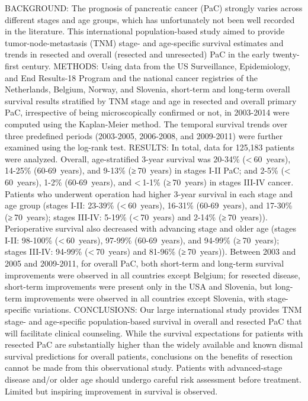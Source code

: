 \documentclass[]{article}
\begin{document}
BACKGROUND: The prognosis of pancreatic cancer (PaC) strongly varies
across different stages and age groups, which has unfortunately not been
well recorded in the literature. This international population-based
study aimed to provide tumor-node-metastasis (TNM) stage- and
age-specific survival estimates and trends in resected and overall
(resected and unresected) PaC in the early twenty-first century.
METHODS: Using data from the US Surveillance, Epidemiology, and End
Results-18 Program and the national cancer registries of the
Netherlands, Belgium, Norway, and Slovenia, short-term and long-term
overall survival results stratified by TNM stage and age in resected and
overall primary PaC, irrespective of being microscopically confirmed or
not, in 2003-2014 were computed using the Kaplan-Meier method. The
temporal survival trends over three predefined periods (2003-2005,
2006-2008, and 2009-2011) were further examined using the log-rank test.
RESULTS: In total, data for 125,183 patients were analyzed. Overall,
age-stratified 3-year survival was 20-34\% (\textless{} 60~years),
14-25\% (60-69~years), and 9-13\% (≥ 70~years) in stages I-II PaC; and
2-5\% (\textless{} 60~years), 1-2\% (60-69~years), and \textless{} 1-1\%
(≥ 70~years) in stages III-IV cancer. Patients who underwent operation
had higher 3-year survival in each stage and age group (stages I-II:
23-39\% (\textless{} 60~years), 16-31\% (60-69~years), and 17-30\%
(≥ 70~years); stages III-IV: 5-19\% (\textless{} 70~years) and 2-14\%
(≥ 70~years)). Perioperative survival also decreased with advancing
stage and older age (stages I-II: 98-100\% (\textless{} 60~years),
97-99\% (60-69~years), and 94-99\% (≥ 70~years); stages III-IV: 94-99\%
(\textless{} 70~years) and 81-96\% (≥ 70~years)). Between 2003 and 2005
and 2009-2011, for overall PaC, both short-term and long-term survival
improvements were observed in all countries except Belgium; for resected
disease, short-term improvements were present only in the USA and
Slovenia, but long-term improvements were observed in all countries
except Slovenia, with stage-specific variations. CONCLUSIONS: Our large
international study provides TNM stage- and age-specific
population-based survival in overall and resected PaC that will
facilitate clinical counseling. While the survival expectations for
patients with resected PaC are substantially higher than the widely
available and known dismal survival predictions for overall patients,
conclusions on the benefits of resection cannot be made from this
observational study. Patients with advanced-stage disease and/or older
age should undergo careful risk assessment before treatment. Limited but
inspiring improvement in survival is observed.
\end{document}
